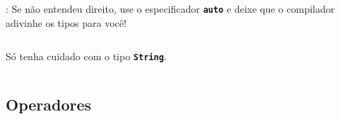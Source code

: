 \begin{frame}{\insertsection: \insertsubsection}
  Se não entendeu direito, use o especificador \textbf{\texttt{\textcolor{CustomOrange}{auto}}} e deixe que o compilador adivinhe os tipos para você!
  \inputminted[firstline=16,lastline=20]{arduino}{sketches/introLinguagem/.variaveis.ino}

  \pause
  Só tenha cuidado com o tipo \textbf{\texttt{\textcolor{CustomOrange}{String}}}.
  \inputminted[firstline=22,lastline=26]{arduino}{sketches/introLinguagem/.variaveis.ino}
\end{frame}


\subsection{Operadores}


